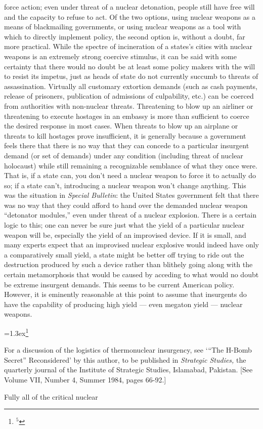 force action; even under threat of a nuclear detonation, people still have
free will and the capacity to refuse to act.
\bigskip
Of the two options, using nuclear weapons as a means of blackmailing
governments, or using nuclear weapons as a tool with which to directly 
implement policy, the second option is, without a doubt, far more practical.
While the spectre of incineration of a states's cities with nuclear weapons
is an extremely strong coercive stimulus, it can be said with some certainty
that there would no doubt be at least some policy makers with the will to
resist its impetus, just as heads of state do not currently succumb to threats
of assassination. Virtually all customary extortion demands (such as cash
payments, release of prisoners, publication of admissions of culpability, etc.)
can be coerced from authorities with non-nuclear threats. Threatening to blow
up an airliner or threatening to execute hostages in an embassy is more than
sufficient to coerce the desired response in most cases. When threats to blow up
an airplane or threats to kill hostages prove insufficient, it is generally
because a government feels there that there is no way that they can concede to
a particular insurgent demand (or set of demands) under any condition
(including threat of nuclear holocaust) while still remaining a recognizable
semblance of what they once were. That is, if a state can, you don't need a
nuclear weapon to force it to actually do so; if a state can't, introducing a
nuclear weapon won't change anything. This was the situation in {\it Special
Bulletin}: the United States government felt that there was no way that they
could afford to hand over the demanded nuclear weapon ``detonator modules,''
even under threat of a nuclear explosion. There is a certain logic to this; one
can never be sure just what the yield of a particular nuclear weapon will be,
especially the yield of an improvised device. If it is small, and many experts
expect that an improvised nuclear explosive would indeed have only a
comparatively small yield, a state might be better off trying to ride out the
destruction produced by such a device rather than blithely going along with
the certain metamorphosis that would be caused by acceding to what would no 
doubt be extreme insurgent demands. This seems to be current American policy.
\bigskip
However, it is eminently reasonable at this point to assume that insurgents do
have the capability of producing high yield --- even megaton yield --- nuclear
weapons.{\baselineskip=1.3ex\footnote{$^{5}$}{For a discussion of 
the logistics of thermonuclear
insurgency, see `\thinspace ``The H-Bomb 
Secret'' Reconsidered' by this author, to
be published in {\it Strategic Studies,} the quarterly journal of the 
Institute of Strategic Studies, Islamabad, Pakistan. [See Volume VII, Number 4,
Summer 1984, pages 66-92.]\par}} Fully all of the critical nuclear
